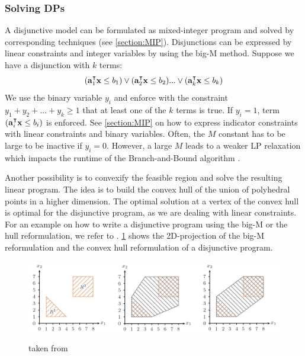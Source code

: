 \subsubsection*{Solving DPs}  \label{section:solving_dps}
A disjunctive model can be formulated as mixed-integer program and solved by corresponding techniques (see \cref{section:MIP}). Disjunctions can be expressed by linear constraints and integer variables by using the big-M method. Suppose we have a disjunction with $k$ terms:
\begin{equation*}
    (\bold a_1^\intercal \bold x \leq b_1) \lor (\bold a_2^\intercal \bold x \leq b_2) ... \lor (\bold a_k^\intercal \bold x \leq b_k)
\end{equation*}
We use the binary variable $y_i$ and enforce with the constraint $y_1 +  y_2 + ... + y_k \geq 1$ that at least one of the $k$ terms is true. If $y_i=1$, term $(\bold a_i^\intercal \bold x \leq b_i)$ is enforced. See \cref{section:MIP} on how to express indicator constraints with linear constraints and binary variables. Often, the $M$ constant has to be large to be inactive if $y_i=0$. However, a large $M$ leads to a weaker LP relaxation which impacts the runtime of the Branch-and-Bound algorithm \cite{aps_mosek_nodate}. 

Another possibility is to convexify the feasible region and solve the resulting linear program. The idea is to build the convex hull of the union of polyhedral points in a higher dimension. The optimal solution at a vertex of the convex hull is optimal for the disjunctive program, as we are dealing with linear constraints. %
For an example on how to write a disjunctive program using the big-M or the hull reformulation, we refer to \cite{perez_disjunctiveprogrammingjl_2023}.
\cref{fig:dp_solving_techniques} shows the 2D-projection of the big-M reformulation and the convex hull reformulation of a disjunctive program. 

\begin{figure}[h!]
    \caption{taken from \cite{hutchison_automating_2010}}
    \centering
    \includegraphics[width=1.0\textwidth]{Images/dp_solving_techniques.png}
    \label{fig:dp_solving_techniques}
\end{figure}

